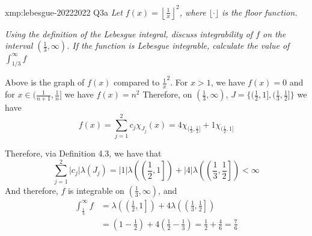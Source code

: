\documentclass[landscape, 8pt]{extarticle}
\begin{document}
\begin{multicols}{3}
\begin{xmp}{xmp:lebesgue-2022}{2022 Q3a}
	\textit{Let $\displaystyle f(x) = \left\lfloor \frac{1}{x} \right\rfloor^{2}$, where $\lfloor \cdot \rfloor$ is the floor function.}

	\textit{Using the definition of the Lebesgue integral, discuss integrability of $f$ on the interval $( \frac{1}{3}, \infty)$. If the function is Lebesgue integrable, calculate the value of $\int_{ 1 /3}^{\infty}f$}

	\vspace{-2pt}
	\begin{center}
	\end{center}
	\vspace{-5pt}

	Above is the graph of $f(x)$ compared to $\frac{1}{x}^{2}$.
	\newline For $x > 1$, we have $f(x) = 0$ and for $x\in (\frac{1}{n+1}, \frac{1}{n}]$ we have $f(x) = n^{2}$
	\newline Therefore, on $(\frac{1}{3}, \infty)$, $J = \{( \frac{1}{2}, 1], ( \frac{1}{3}, \frac{1}{2}]\}$ we have
		\[f(x) = \sum_{j = 1}^{2} c_{j} \chi_{J_{j}}(x) = 4\chi_{( \frac{1}{3}, \frac{1}{2}]} + 1\chi_{( \frac{1}{2}, 1]}\]

	Therefore, via Definition 4.3, we have that
	\[\sum_{j = 1}^{2} \lvert c_{j} \rvert \lambda(J_{j}) =\lvert 1 \rvert \lambda\left( \left( \frac{1}{2}, 1\right]\right) + \lvert 4 \rvert \lambda\left( \left( \frac{1}{3}, \frac{1}{2}\right]\right) < \infty\]
	And therefore, $f$ is integrable on $(\frac{1}{3}, \infty)$, and
	\begin{align*}
		\int_{ \frac{1}{3}}^{\infty} f &= \lambda\left( \left( \frac{1}{2}, 1\right]\right) + 4\lambda\left( \left( \frac{1}{3}, \frac{1}{2}\right]\right) \\
									   &= \left(1 - \frac{1}{2}\right) + 4\left( \frac{1}{2} - \frac{1}{3}\right) = \frac{1}{2} + \frac{4}{6} = \frac{7}{6}
	\end{align*}


\end{xmp}
\end{multicols}
\end{document}
